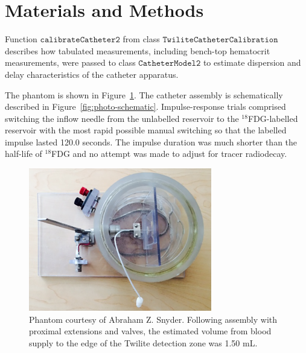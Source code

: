\section{Materials and Methods}

Function $\texttt{calibrateCatheter2}$ from class 
$\texttt{TwiliteCatheterCalibration}$ describes how tabulated measurements, 
including bench-top hematocrit measurements, were passed to class 
$\texttt{CatheterModel2}$ to estimate dispersion and delay characteristics 
of the catheter apparatus.  

The phantom is shown in Figure~\ref{fig:catheter-phantom}.  The catheter
assembly is schematically described in Figure~\ref{fig:photo-schematic}.  
Impulse-response trials comprised switching the inflow needle from the 
unlabelled reservoir to the $^{18}$FDG-labelled reservoir with the most
rapid possible manual switching so that the labelled impulse lasted 120.0 
seconds.  The impulse duration was much shorter than the half-life of
$^{18}$FDG and no attempt was made to adjust for tracer radiodecay.

\begin{figure}[h]
\includegraphics[width=8cm]{catheter-phantom.png}
\caption{Phantom courtesy of Abraham Z. Snyder.  Following assembly with proximal extensions and valves, the estimated volume from blood supply to the edge of the Twilite detection zone was 1.50 mL.\label{fig:catheter-phantom}}
\end{figure}

